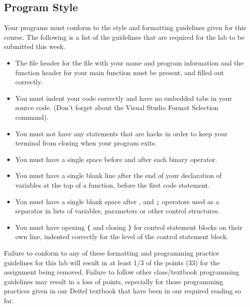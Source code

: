\documentclass[11pt]{article}
\begin{document}
\subsection*{Program Style}
\label{sec-5-2}


Your programs must conform to the style and formatting guidelines given for this course.
The following is a list of the guidelines that are required for the lab to be submitted
this week.

\begin{itemize}
\item The file header for the file with your name and program information
  and the function header for your main function must be present, and
  filled out correctly.
\item You must indent your code correctly and have no embedded tabs in
  your source code. (Don't forget about the Visual Studio Format
  Selection command).
\item You must not have any statements that are hacks in order to keep
  your terminal from closing when your program exits.
\item You must have a single space before and after each binary operator.
\item You must have a single blank line after the end of your declaration
  of variables at the top of a function, before the first code
  statement.
\item You must have a single blank space after , and \verb~;~ operators used as a
  separator in lists of variables, parameters or other control
  structures.
\item You must have opening \verb~{~ and closing \verb~}~ for control statement blocks
  on their own line, indented correctly for the level of the control
  statement block.
\end{itemize}

Failure to conform to any of these formatting and programming practice
guidelines for this lab will result in at least 1/3 of the points (33)
for the assignment being removed.  Failure to follow other
class/textbook programming guidelines may result in a loss of points,
especially for those programming practices given in our Deitel
textbook that have been in our required reading so far.
\end{document}
